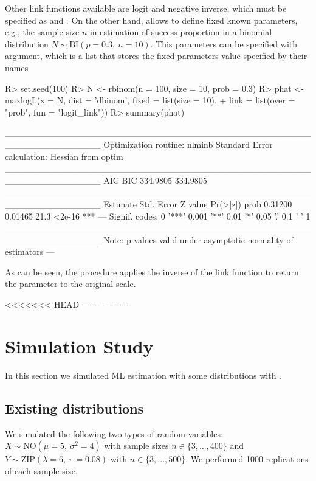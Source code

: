 \documentclass[nojss]{jss}
\begin{document}
Other link functions available are logit and negative inverse, which must be specified as  and . On the other hand,  allows to define fixed known parameters, e.g., the sample size $n$ in estimation of success proportion in a binomial distribution $N \sim \text{BI}(p=0.3, \: n=10)$. This parameters can be specified with  argument, which is a list that stores the fixed parameters value specified by their names

\begin{Schunk}
\begin{Sinput}
R> set.seed(100)
R> N <- rbinom(n = 100, size = 10, prob = 0.3)
R> phat <- maxlogL(x = N, dist = 'dbinom', fixed = list(size = 10),
+                  link = list(over = "prob", fun = "logit_link"))
R> summary(phat)
\end{Sinput}
\begin{Soutput}
_______________________________________________________________
Optimization routine: nlminb 
Standard Error calculation: Hessian from optim 
_______________________________________________________________
       AIC      BIC
  334.9805 334.9805
_______________________________________________________________
     Estimate  Std. Error Z value Pr(>|z|)    
prob   0.31200    0.01465    21.3   <2e-16 ***
---
Signif. codes:  0 '***' 0.001 '**' 0.01 '*' 0.05 '.' 0.1 ' ' 1
_______________________________________________________________
Note: p-values valid under asymptotic normality of estimators 
---
\end{Soutput}
\end{Schunk}

As can be seen, the procedure applies the inverse of the link function to return the parameter to the original scale.

<<<<<<< HEAD
=======
\section{Simulation Study}

In this section we simulated ML estimation with some distributions with .

\subsection{Existing distributions}
We simulated the following two types of random variables: $X \sim \text{NO}(\mu=5,\: \sigma^2=4)$ with sample sizes $n \in \lbrace 3,...,400 \rbrace$ and $Y \sim \text{ZIP}(\lambda=6,\: \pi=0.08)$ with $n \in \lbrace 3,...,500 \rbrace$. We performed 1000 replications of each sample size.
\end{document}
